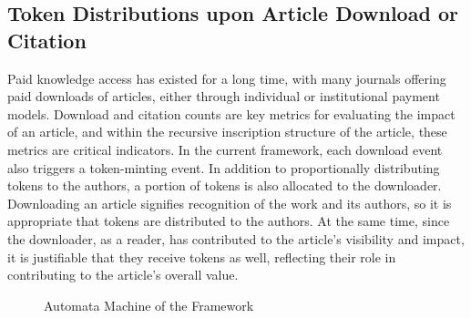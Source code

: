 \documentclass[lettersize,journal]{IEEEtran}
\begin{document}
\subsection{Token Distributions upon Article Download or Citation}


Paid knowledge access has existed for a long time, with many journals offering paid downloads of articles, either through individual or institutional payment models. Download and citation counts are key metrics for evaluating the impact of an article, and within the recursive inscription structure of the article, these metrics are critical indicators. In the current framework, each download event also triggers a token-minting event. In addition to proportionally distributing tokens to the authors, a portion of tokens is also allocated to the downloader. Downloading an article signifies recognition of the work and its authors, so it is appropriate that tokens are distributed to the authors. At the same time, since the downloader, as a reader, has contributed to the article's visibility and impact, it is justifiable that they receive tokens as well, reflecting their role in contributing to the article’s overall value.


\begin{figure}[ht]
  \caption{Automata Machine of the Framework}
  \label{fig:automataMachine}
\end{figure}
\end{document}
